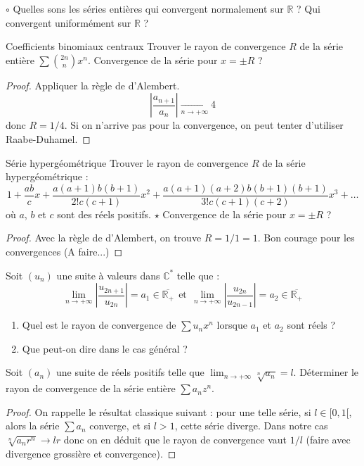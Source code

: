 \documentclass[french,a4paper]{article}
\newcommand{\R}{\mathbb{R}}
\newcommand{\C}{\mathbb{C}}
\newcommand{\st}{^*}
\theoremstyle{plain}
\theoremstyle{definition}
\theoremstyle{remark}
\begin{document}
\begin{ex}[Moulin.SE.04]{$\circ$}
	Quelles sons les séries entières qui convergent normalement sur $\R$ ? Qui convergent uniformément sur $\R$ ?
\end{ex}

\begin{ex}[Moulin.SE.05]{Coefficients binomiaux centraux}
	Trouver le rayon de convergence $R$ de la série entière $\sum \binom{2n}{n}x^n$. Convergence de la série pour $x=\pm R$ ?
\end{ex}
\begin{proof}
	Appliquer la règle de d'Alembert. $$\left\lvert\frac{a_{n+1}}{a_n}\right\rvert\xrightarrow[n\to+\infty]{}4$$ donc $R=1/4$. Si on n'arrive pas pour la convergence, on peut tenter d'utiliser Raabe-Duhamel.
\end{proof}

\begin{ex}[Moulin.SE.06]{Série hypergéométrique}
	Trouver le rayon de convergence $R$ de la série hypergéométrique : $$1+\frac{ab}{c}x+\frac{a(a+1)b(b+1)}{2!c(c+1)}x^2+\frac{a(a+1)(a+2)b(b+1)(b+1)}{3!c(c+1)(c+2)}x^3+\ldots$$ où $a$, $b$ et $c$ sont des réels positifs. $\star$ Convergence de la série pour $x=\pm R$ ?
\end{ex}
\begin{proof}
	Avec la règle de d'Alembert, on trouve $R=1/1=1$. Bon courage pour les convergences (A faire...)
\end{proof}

\begin{ex}[Moulin.SE.07]{}
	Soit $(u_n)$ une suite à valeurs dans $\C\st$ telle que : $$\underset{n\to+\infty}{\lim}\left\lvert\frac{u_{2n+1}}{u_{2n}}\right\rvert=a_1\in\overline{\R_+}\ \ \text{et}\ \ \underset{n\to+\infty}{\lim}\left\lvert\frac{u_{2n}}{u_{2n-1}}\right\rvert=a_2\in\overline{\R_+}$$
	\begin{enumerate}
		\item Quel est le rayon de convergence de $\displaystyle\sum u_nx^n$ lorsque $a_1$ et $a_2$ sont réels ?
		\item Que peut-on dire dans le cas général ?
	\end{enumerate}
\end{ex}

\begin{ex}[Moulin.SE.08]{}
	Soit $(a_n)$ une suite de réels positifs telle que $\displaystyle\lim_{n\to+\infty}\sqrt[n]{a_n}=l$. Déterminer le rayon de convergence de la série entière $\sum a_nz^n$.
\end{ex}
\begin{proof}
	On rappelle le résultat classique suivant : pour une telle série, si $l\in[0,1[$, alors la série $\sum a_n$ converge, et si $l>1$, cette série diverge. Dans notre cas $\sqrt[n]{a_nr^n}\to lr$ donc on en déduit que le rayon de convergence vaut $1/l$ (faire avec divergence grossière et convergence).
\end{proof}
\end{document}
